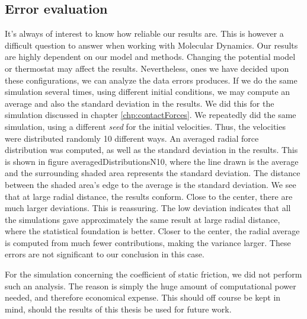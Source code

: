 \documentclass[twoside,english]{uiofysmaster}
\begin{document}
\subsection{Error evaluation}
It's always of interest to know how reliable our results are. 
This is however a difficult question to answer when working with Molecular Dynamics. 
Our results are highly dependent on our model and methods. 
Changing the potential model or thermostat may affect the results.
Nevertheless, ones we have decided upon these configurations, we can analyze the data errors produces.
If we do the same simulation several times, using different initial conditions, we may compute an average and also the standard deviation in the results.
We did this for the simulation discussed in chapter \ref{chp:contactForces}. 
We repeatedly did the same simulation, using a different \textit{seed} for the initial velocities. 
Thus, the velocities were distributed randomly 10 different ways. 
An averaged radial force distribution was computed, as well as the standard deviation in the results. 
This is shown in figure averagedDistributionsN10, where the line drawn is the average and the surrounding shaded area represents the standard deviation. The distance between the shaded area's edge to the average is the standard deviation.
We see that at large radial distance, the results conform. 
Close to the center, there are much larger deviations. 
This is reassuring. 
The low deviation indicates that all the simulations gave approximately the same result at large radial distance, where the statistical foundation is better. 
Closer to the center, the radial average is computed from much fewer contributions, making the variance larger. 
These errors are not significant to our conclusion in this case.

For the simulation concerning the coefficient of static friction, we did not perform such an analysis. 
The reason is simply the huge amount of computational power needed, and therefore economical expense. 
This should off course be kept in mind, should the results of this thesis be used for future work.
%   
\end{document}
